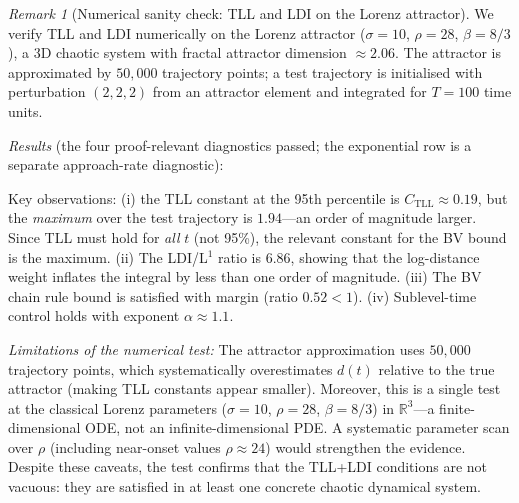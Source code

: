 \documentclass[12pt,a4paper]{article}
\theoremstyle{definition}
\theoremstyle{plain}
\theoremstyle{remark}
\newtheorem{remark}[definition]{Remark}
\begin{document}
\begin{remark}[Numerical sanity check: TLL and LDI on the Lorenz attractor]
\label{rem:tll-ldi-lorenz}
We verify TLL and LDI numerically on the Lorenz attractor ($\sigma = 10$, $\rho = 28$, $\beta = 8/3$), a 3D chaotic system with fractal attractor dimension $\approx 2.06$. The attractor is approximated by $50{,}000$ trajectory points; a test trajectory is initialised with perturbation $(2, 2, 2)$ from an attractor element and integrated for $T = 100$ time units.

\emph{Results} (the four proof-relevant diagnostics passed; the
exponential row is a separate approach-rate diagnostic):

\begin{center}
\small
{}
\end{center}

Key observations: (i) the TLL constant at the 95th percentile
is $C_{\mathrm{TLL}} \approx 0.19$, but the \emph{maximum} over
the test trajectory is $1.94$---an order of magnitude larger.
Since TLL must hold for \emph{all} $t$ (not 95\%), the relevant
constant for the BV bound is the maximum.
(ii) The LDI/L$^1$ ratio is $6.86$, showing that the log-distance
weight inflates the integral by less than one order of magnitude.
(iii) The BV chain rule bound is satisfied with margin (ratio $0.52 < 1$).
(iv) Sublevel-time control holds with exponent $\alpha \approx 1.1$.

\emph{Limitations of the numerical test:}
The attractor approximation uses $50{,}000$ trajectory points, which
systematically overestimates $d(t)$ relative to the true attractor
(making TLL constants appear smaller).  Moreover, this is a single
test at the classical Lorenz parameters ($\sigma=10$, $\rho=28$,
$\beta=8/3$) in $\mathbb{R}^3$---a finite-dimensional ODE, not an
infinite-dimensional PDE.  A systematic parameter scan over $\rho$
(including near-onset values $\rho \approx 24$) would strengthen
the evidence.  Despite these caveats, the test confirms that the
TLL+LDI conditions are not vacuous: they are satisfied in at least
one concrete chaotic dynamical system.
\end{remark}
\end{document}
